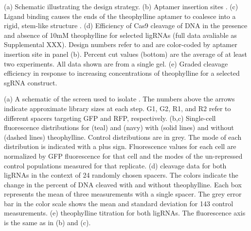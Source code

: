 \documentclass[10pt,oneside]{article}
\begin{document}

 (a) Schematic illustrating the design strategy.
%
%
 (b) Aptamer insertion sites \autocite{briner2014}.
%
%
 (c) Ligand binding causes the ends of the theophylline aptamer to coalesce 
%
%
 into a rigid, stem-like structure \autocite{zimmerman1997}.
 (d) Efficiency of \invitro{} Cas9 cleavage of DNA in the presence and absence 
 of 10mM theophylline for selected ligRNAs  (full data avaliable as 
 Supplemental XXX).  Design numbers refer to  and 
 are color-coded by aptamer insertion site in panel (b).  Percent cut values 
 (bottom) are 
%
%
 the average of at least two experiments.  All data shown are from a single 
 gel.
 (e) Graded cleavage efficiency in response to increasing concentrations of theophylline for a selected sgRNA construct.



 (a) A schematic of the screen used to isolate \ligrnaF{}.  The numbers above 
 the arrows indicate approximate library sizes at each step.  G1, G2, R1, and 
 R2 refer to different spacers targeting GFP and RFP, respectively.
 (b,c) Single-cell fluorescence distributions for \ligrnaF{} (teal) and 
 \ligrnaB{} (navy) with (solid lines) and without (dashed lines) theophylline.  
 Control distributions are in grey.  The mode of each distribution is indicated 
 with a plus sign.  Fluorescence values for each cell are normalized by GFP 
 fluorescence for that cell and the modes of the un-repressed control 
 populations measured for that replicate.
 (d) \Invitro{} cleavage data for both ligRNAs in the context of 24 randomly 
 chosen spacers.  The colors indicate the change in the percent of DNA cleaved 
 with and without theophylline.  Each box represents the mean of three 
 measurements with a single spacer.   The grey error bar in the color scale 
 shows the mean and standard deviation for 143 control measurements.
 (e) \Invivo{} theophylline titration for both ligRNAs.  The fluorescence axis 
 is the same as in (b) and (c).
 
\end{document}
